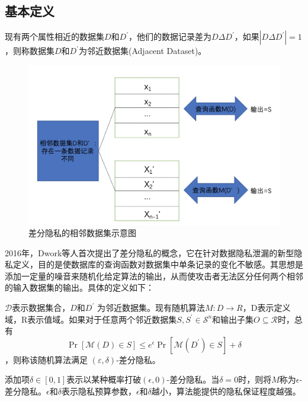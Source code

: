 \subsection{基本定义}
\begin{define}[邻近数据集]\label{邻近数据集}
现有两个属性相近的数据集$D$和$D^{\prime}$，他们的数据记录差为$D \Delta D^{\prime}$，如果$\left|D \Delta D^{\prime}\right|=1$，则称数据集$D$和$D^{\prime}$为邻近数据集(Adjacent Dataset)。
\end{define}

\begin{figure}[!hbt]
\centering
	\includegraphics[scale=0.6]{fig2/C2/相邻数据集示意图}%
	\caption{差分隐私的相邻数据集示意图}
	\label{fig:相邻数据集示意图}	
\end{figure}

2016年，Dwork等人首次提出了差分隐私的概念，它在针对数据隐私泄漏的新型隐私定义，目的是使数据库的查询函数对数据集中单条记录的变化不敏感。其思想是添加一定量的噪音来随机化给定算法的输出，从而使攻击者无法区分任何两个相邻的输入数据集的输出。具体的定义如下：
\begin{define}[(ε,δ)-差分隐私]\label{(ε,δ)-差分隐私}
$\mathcal{D}$表示数据集合，$D$和$D^{\prime}$ 为邻近数据集。现有随机算法$M: D \rightarrow R$，D表示定义域，R表示值域。如果对于任意两个邻近数据集$S, S^{\prime} \in \mathcal{S}^{n}$和输出子集$O \subseteq \mathcal{R}$时，总有$$
\operatorname{Pr}[\mathcal{M}(D) \in S] \leq e^{\epsilon} \operatorname{Pr}\left[\mathcal{M}\left(D^{\prime}\right) \in S\right]+\delta
$$，则称该随机算法满足 $(\varepsilon, \delta)$-差分隐私。
\end{define}
添加项$\delta \in[0,1]$表示以某种概率打破$(\epsilon, 0)$-差分隐私。当$\delta=0$时，则将$M$称为$\epsilon$-差分隐私。$\epsilon$和$\delta$表示隐私预算参数，$\epsilon$和$\delta$越小，算法能提供的隐私保证程度越强。

